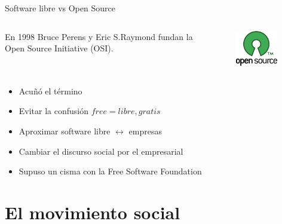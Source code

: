 \documentclass{beamer}
\begin{document}
\begin{frame}{Software libre vs Open Source}
  \begin{columns}
     En 1998 Bruce Perens y Eric S.Raymond fundan         la Open Source     Initiative (OSI). 

    \begin{figure}
      \centering
      \includegraphics[width=0.9\textwidth]{pics/osi-logo.png}
    \end{figure}
  \end{columns}

  \begin{itemize}
  \item Acuñó el término 
  \item Evitar la confusión $free = {libre, gratis}$
  \item Aproximar software libre $\leftrightarrow$ empresas
  \item Cambiar el discurso social por el empresarial 
  \item Supuso un cisma con la Free Software Foundation
  \end{itemize}
\end{frame}


\section{El movimiento social}
\end{document}
